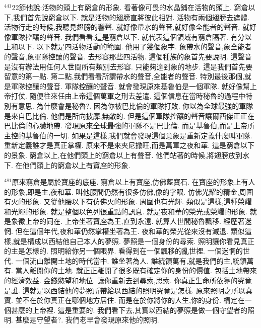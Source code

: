 \documentclass{book}
\begin{document}
$^{441}$22節他說:活物的頭上有窮倉的形象.
看著像可畏的水晶鋪在活物的頭上.
窮倉以下,我們首先說窮倉以下.
就是活物的翅膀直將彼此相對.
活物有兩個翅膀去遮體.
活物行走的時候,我聽見翅膀的響聲.
就好像帶水的聲音,就好像全能者的聲音.
就好像軍隊控釀的聲音.
我們看看,這是窮倉以下.
就代表這個領域有窮倉隔著.
有分以上和以下.
以下就是四活物活動的範圍.
他用了幾個象字.
象帶水的聲音,象全能者的聲音,象軍隊控釀的聲音.
去形容那些四活物.
這個種族的象首先要說明.
這聲音是沒有辦法用任何人世間所有類別去形容.
只能夠達到象的地步.
這是我們首先要留意的第一點.
第二點,我們看看所謂帶水的聲音,全能者的聲音.
特別最後那個,就是軍隊控釀的聲音.
軍隊控釀的聲音.
就會發現原來基魯伯是一個軍隊.
就好像幫上帝打仗.
隨便往來任由上帝這個萬軍之刑去差遣.
這個信息在當時秘魯的過程中特別有意思.
為什麼會是秘魯?.
因為你被巴比倫的軍隊打敗.
你以為全球最強的軍隊是來自巴比倫.
他們是所向披靡,無敵的.
但是這個軍隊控釀的聲音讓爾西傑正正在巴比倫的心臟地帶.
發現原來全球最強的軍隊不是巴比倫.
而是基魯伯,而是上帝所主控的基魯伯的一切.
如果是這樣,我們就會發現這個意象是重新定義什麼叫軍隊.
重新定義誰才是真正掌權.
原來不是來夾尼撒旺,而是萬軍之夜和華.
這是窮倉以下的景象.
窮倉以上,在他們頭上的窮倉以上有聲音.
他們站著的時候,將翅膀放到水下.
在他們頭上的窮倉以上有寶座的形象.

$^{481}$原來窮倉是屬於寶座的底座.
窮倉以上有寶座,仿佛藍寶石.
在寶座的形象上有人的形象,即是主,夜和華.
叫他腰間仍然有很多仿佛,像的字眼.
仿佛光耀的精金,周圍有火的形象.
又從他腰以下有仿佛火的形象.
周圍也有光輝.
類似是這樣,這種榮耀和光輝的形象.
就是整個以色列很重點的訊息.
就是夜和華的榮光或榮耀的形象.
就是象徵上帝的同在.
上帝坐著寶座為王,直到永遠.
就算人世間秘魯飄移.
經歷著迷惘.
但在這個年代,夜和華仍然掌權坐著為王.
夜和華的榮光從來沒有減退.
類似這樣,就是構成以西結他自己本人的夢照.
夢照是一個身份的尋索.
照明讓你看見真正的主是怎樣的.
照明給你另一個眼界.
看得到在一個飄移的亂世裡.
一個迷惘的世代.
一個流山離開土地的時代當中.
誰坐著為人.
誰統領萬有,就是我們的主,統領萬有.
當人離開你的土地.
就正正離開了很多既有確定你的身份的價值.
包括土地帶來的經濟效益.
金錢慾望和地位.
讓你重新去到尋索,思索.
你真正生命所依靠的究竟是誰.
這就是以西結他的夢照所帶給以西結的照明究竟是怎樣.
原來照明之所以真實.
並不在於你真正在哪個地方居住.
而是在於你將你的人生,你的身份.
構定在一個甚麼的上帝裡.
這是重要的.
我們看下去,其實以西結的夢照是做一個守望者的照明.
甚麼是守望者?.
我們老早會發現原來他的照明.
\end{document}
